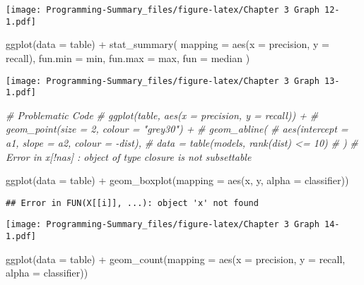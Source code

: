 \documentclass[
]{article}
\newenvironment{Shaded}{\begin{snugshade}}{\end{snugshade}}
\newcommand{\AttributeTok}[1]{\textcolor[rgb]{0.77,0.63,0.00}{#1}}
\newcommand{\CommentTok}[1]{\textcolor[rgb]{0.56,0.35,0.01}{\textit{#1}}}
\newcommand{\FunctionTok}[1]{\textcolor[rgb]{0.00,0.00,0.00}{#1}}
\newcommand{\NormalTok}[1]{#1}
\newcommand{\SpecialCharTok}[1]{\textcolor[rgb]{0.00,0.00,0.00}{#1}}
\begin{document}
\texttt{[image: Programming-Summary\_files/figure-latex/Chapter 3 Graph 12-1.pdf]}

\begin{Shaded}
\begin{Highlighting}[]
\FunctionTok{ggplot}\NormalTok{(}\AttributeTok{data =}\NormalTok{ table) }\SpecialCharTok{+} 
  \FunctionTok{stat\_summary}\NormalTok{(}
    \AttributeTok{mapping =} \FunctionTok{aes}\NormalTok{(}\AttributeTok{x =}\NormalTok{ precision, }\AttributeTok{y =}\NormalTok{ recall),}
    \AttributeTok{fun.min =}\NormalTok{ min,}
    \AttributeTok{fun.max =}\NormalTok{ max,}
    \AttributeTok{fun =}\NormalTok{ median}
\NormalTok{  )}
\end{Highlighting}
\end{Shaded}

\texttt{[image: Programming-Summary\_files/figure-latex/Chapter 3 Graph 13-1.pdf]}

\begin{Shaded}
\begin{Highlighting}[]
\CommentTok{\# Problematic Code}
\CommentTok{\# ggplot(table, aes(x = precision, y = recall)) + }
\CommentTok{\#   geom\_point(size = 2, colour = "grey30") + }
\CommentTok{\#   geom\_abline(}
\CommentTok{\#     aes(intercept = a1, slope = a2, colour = {-}dist), }
\CommentTok{\#     data = table(models, rank(dist) \textless{}= 10)}
\CommentTok{\#   )}
\CommentTok{\# Error in x[!nas] : object of type \textquotesingle{}closure\textquotesingle{} is not subsettable}
\end{Highlighting}
\end{Shaded}

\begin{Shaded}
\begin{Highlighting}[]
\FunctionTok{ggplot}\NormalTok{(}\AttributeTok{data =}\NormalTok{ table) }\SpecialCharTok{+}
   \FunctionTok{geom\_boxplot}\NormalTok{(}\AttributeTok{mapping =} \FunctionTok{aes}\NormalTok{(x, y, }\AttributeTok{alpha =}\NormalTok{ classifier))}
\end{Highlighting}
\end{Shaded}

\begin{verbatim}
## Error in FUN(X[[i]], ...): object 'x' not found
\end{verbatim}

\texttt{[image: Programming-Summary\_files/figure-latex/Chapter 3 Graph 14-1.pdf]}

\begin{Shaded}
\begin{Highlighting}[]
\FunctionTok{ggplot}\NormalTok{(}\AttributeTok{data =}\NormalTok{ table) }\SpecialCharTok{+}
  \FunctionTok{geom\_count}\NormalTok{(}\AttributeTok{mapping =} \FunctionTok{aes}\NormalTok{(}\AttributeTok{x =}\NormalTok{ precision, }\AttributeTok{y =}\NormalTok{ recall, }\AttributeTok{alpha =}\NormalTok{ classifier))}
\end{Highlighting}
\end{Shaded}
\end{document}

